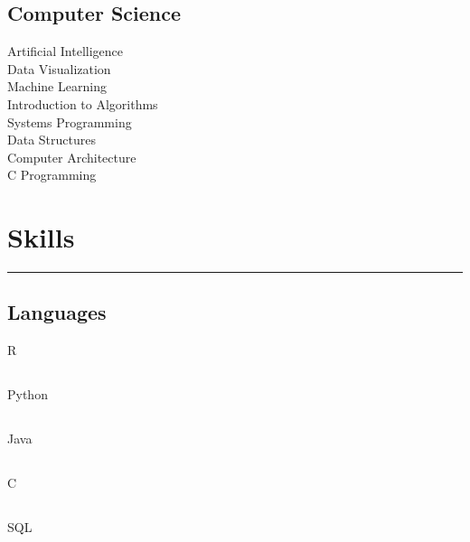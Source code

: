 \documentclass[]{sahana}
\begin{document}
\begin{minipage}[t]{0.33\textwidth}
\subsection{Computer Science}
Artificial Intelligence \\
Data Visualization \\
Machine Learning\\
Introduction to Algorithms\\
Systems Programming\\
Data Structures\\
Computer Architecture\\
C Programming
\sectionsep

\section{Skills}
\noindent\rule{5cm}{0.4pt}
\subsection{Languages}
R \hfill{}\hspace{40pt}
\subsection{}\vspace{-12pt}
Python \hfill{}\hspace{40pt}
\subsection{}\vspace{-12pt}
Java \hfill{}\hspace{40pt}
\subsection{}\vspace{-12pt}
C \hfill{}\hspace{40pt}
\subsection{}\vspace{-12pt}
SQL \hspace*{0pt}\hfill{}\hspace{40pt}

\end{minipage}
\end{document}
